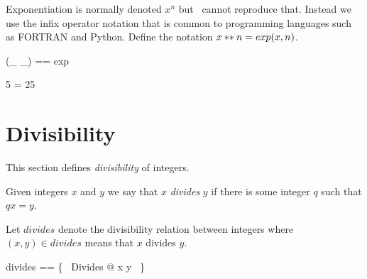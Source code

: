 \documentclass{amsart}
\begin{document}
\begin{remark}
\end{remark}

\begin{remark}
\end{remark}

Exponentiation is normally denoted $x^n$ but \ZN\ cannot reproduce that.
Instead we use the infix operator notation that is common to programming languages such as FORTRAN and Python.
Define the notation $x \mathbin{**} n = exp(x, n)$.

\begin{zed}
	(\_ \expN \_) == exp
\end{zed}

\begin{example}
\begin{zed}
	5  = 25
\end{zed}
\end{example}

\section{Divisibility}

This section defines \textit{divisibility} of integers.

Given integers $x$ and $y$ we say that $x$ \textit{divides} $y$ if there is some integer $q$ such 
that $q x = y$.


Let $divides$ denote the divisibility relation between integers
where $(x,y) \in divides$ means that $x$ divides $y$.

\begin{zed}
	divides == \{~ Divides @ x \mapsto y ~\}
\end{zed}

\begin{remark}
\end{remark}
\end{document}
